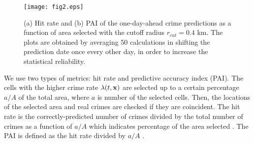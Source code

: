 \documentclass[review]{elsarticle}
\newcommand{\bv}[1]{{\bf #1}}
\begin{document}
\begin{figure}[]
\centering
\texttt{[image: fig2.eps]}
\caption{
   (a) Hit rate and (b) PAI of the one-day-ahead crime predictions as a function of area selected
      with the cutoff radius $r_{cut} = 0.4$ km.
The plots are obtained by averaging 50 calculations in shifting 
the prediction date once every other day,
in order to increase the statistical reliability.
  }
  \label{fig2}
\end{figure}


We use two types of metrics: hit rate and predictive accuracy index (PAI).
 The cells with the higher crime rate 
$\lambda(t, \bv{x})$
are selected up to a certain percentage $a/A$ of the total area,
where $a$ is number of the selected cells.
Then, the locations of the selected area and  real crimes
are checked if they are coincident.
The hit rate is 
the correctly-predicted number of crimes divided by the total number of crimes as a function of $a/A$ which indicates
percentage of the area selected \cite{mohler,bowers}.
The PAI is defined as
the hit rate divided by $a/A$ \cite{chainey}.
\end{document}
